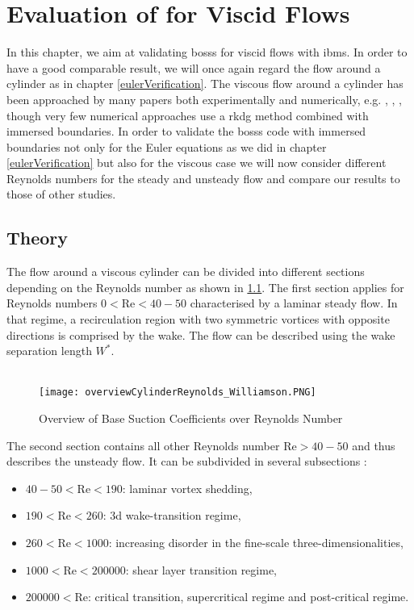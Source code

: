 \chapter{Evaluation of  for Viscid Flows}
\label{viscousCylinder}
In this chapter, we aim at validating \gls{bosss} for viscid flows with \gls{ibm}s. In order to have a good comparable result, we will once again regard the flow around a cylinder as in chapter \cref{eulerVerification}. 
The viscous flow around a cylinder has been approached by many papers both experimentally and numerically, e.g. \textcite{williamson1996vortex}, \textcite{FLM:14223}, \textcite{canutoTaira}, though very few numerical approaches use a \gls{rkdg} method combined with immersed boundaries. In order to validate the \gls{bosss} code with immersed boundaries not only for the Euler equations as we did in chapter \cref{eulerVerification} but also for the viscous case we will now consider different Reynolds numbers for the steady and unsteady flow and compare our results to those of other studies.

\section{Theory}
	The flow around a viscous cylinder can be divided into different sections depending on the Reynolds number as shown in \cref{fig:overview}. The first section applies for Reynolds numbers $0 < \text{Re} < 40-50$ characterised by a laminar steady flow. In that regime, a recirculation region with two symmetric vortices with opposite directions is comprised by the wake. The flow can be described using the wake separation length $W^*$.\\\\
	\begin{figure}[htp]
		\centering
		\texttt{[image: overviewCylinderReynolds\_Williamson.PNG]}
		\caption{Overview of Base Suction Coefficients over Reynolds Number \cite{williamson1996vortex}}
		\label{fig:overview}
	\end{figure} 
	The second section contains all other Reynolds number $\text{Re}> 40-50$ and thus describes the unsteady flow. It can be subdivided in several subsections \cite{williamson1996vortex}:
	\begin{itemize}
		\item $40-50 < \text{Re} < 190$: laminar vortex shedding,
		\item $190 < \text{Re} < 260$: \gls{3d} wake-transition regime,
		\item $260 < \text{Re} < 1000$: increasing disorder in the fine-scale three-dimensionalities,
		\item $1000 < \text{Re} < 200000$: shear layer transition regime,
		\item $200000 < \text{Re}$: critical transition, supercritical regime and post-critical regime.
	\end{itemize}
	

